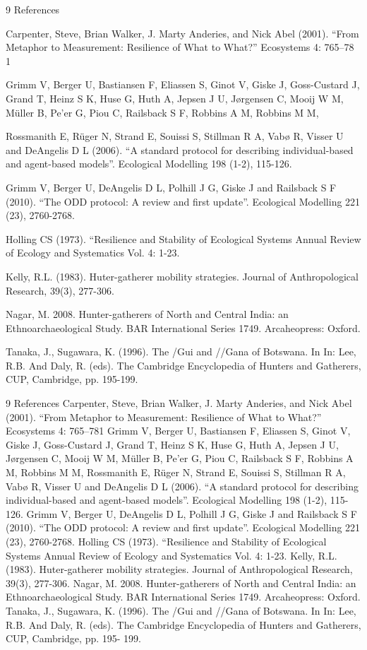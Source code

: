 \documentclass[11pt,oneside,a4paper,openright]{report}
\begin{document}
9
References

Carpenter, Steve, Brian Walker, J. Marty Anderies, and Nick Abel (2001). “From Metaphor to Measurement:
Resilience of What to What?” Ecosystems 4: 765–78 1

Grimm V, Berger U, Bastiansen F, Eliassen S, Ginot V, Giske J, Goss-Custard J, Grand T, Heinz S K, Huse G, Huth A,
Jepsen J U, Jørgensen C, Mooij W M, Müller B, Pe’er G, Piou C, Railsback S F, Robbins A M, Robbins M M,

Rossmanith E, Rüger N, Strand E, Souissi S, Stillman R A, Vabø R, Visser U and DeAngelis D L (2006). “A standard
protocol for describing individual-based and agent-based models”. Ecological Modelling 198 (1-2), 115-126.

Grimm V, Berger U, DeAngelis D L, Polhill J G, Giske J and Railsback S F (2010). “The ODD protocol: A review and
first update”. Ecological Modelling 221 (23), 2760-2768.


Holling CS (1973). “Resilience and Stability of Ecological Systems Annual Review of Ecology and Systematics Vol. 4:
1-23.

Kelly, R.L. (1983). Huter-gatherer mobility strategies. Journal of Anthropological Research, 39(3), 277-306.

Nagar, M. 2008. Hunter-gatherers of North and Central India: an Ethnoarchaeological Study. BAR International Series
1749. Arcaheopress: Oxford.

Tanaka, J., Sugawara, K. (1996). The /Gui and //Gana of Botswana. In In: Lee, R.B. And Daly, R. (eds). The
Cambridge Encyclopedia of Hunters and Gatherers, CUP, Cambridge, pp. 195-199.














9 References
Carpenter, Steve, Brian Walker, J. Marty Anderies, and Nick Abel (2001). “From Metaphor to
Measurement: Resilience of What to What?” Ecosystems 4: 765–781
Grimm V, Berger U, Bastiansen F, Eliassen S, Ginot V, Giske J, Goss-Custard J, Grand T,
Heinz S K, Huse G, Huth A, Jepsen J U, Jørgensen C, Mooij W M, Müller B, Pe’er G, Piou C,
Railsback S F, Robbins A M, Robbins M M, Rossmanith E, Rüger N, Strand E, Souissi S,
Stillman R A, Vabø R, Visser U and DeAngelis D L (2006). “A standard protocol for describing
individual-based and agent-based models”. Ecological Modelling 198 (1-2), 115-126.
Grimm V, Berger U, DeAngelis D L, Polhill J G, Giske J and Railsback S F (2010). “The ODD
protocol: A review and first update”. Ecological Modelling 221 (23), 2760-2768.
Holling CS (1973). “Resilience and Stability of Ecological Systems Annual Review of Ecology
and Systematics Vol. 4: 1-23.
Kelly, R.L. (1983). Huter-gatherer mobility strategies. Journal of Anthropological Research,
39(3), 277-306.
Nagar, M. 2008. Hunter-gatherers of North and Central India: an Ethnoarchaeological Study.
BAR International Series 1749. Arcaheopress: Oxford.
Tanaka, J., Sugawara, K. (1996). The /Gui and //Gana of Botswana. In In: Lee, R.B. And Daly,
R. (eds). The Cambridge Encyclopedia of Hunters and Gatherers, CUP, Cambridge, pp. 195-
199.
\end{document}

